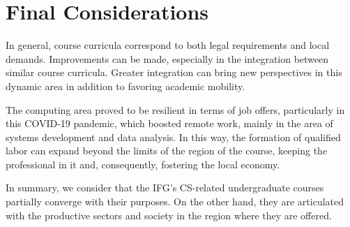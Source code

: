 \documentclass[sigconf, review]{educomp}
\begin{document}
\section{Final Considerations}\label{FinalConsiderations}

In general, course curricula correspond to both legal requirements and local demands.
Improvements can be made, especially in the integration between similar course curricula.
Greater integration can bring new perspectives in this dynamic area in addition to favoring academic mobility.

The computing area proved to be resilient in terms of job offers, particularly in this COVID-19 pandemic, which boosted remote work, mainly in the area of systems development and data analysis.
In this way, the formation of qualified labor can expand beyond the limits of the region of the course, keeping the professional in it and, consequently, fostering the local economy.

In summary, we consider that the IFG's CS-related undergraduate courses partially converge with their purposes.
On the other hand, they are articulated with the productive sectors and society in the region where they are offered.



\end{document}
